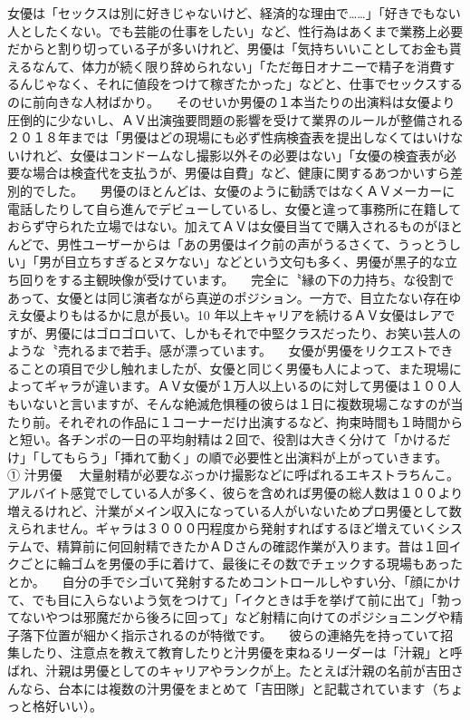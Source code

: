 \documentclass[12pt,UTF8]{ctexbook}
\begin{document}
女優は「セックスは別に好きじゃないけど、経済的な理由で……」「好きでもない人としたくない。でも芸能の仕事をしたい」など、性行為はあくまで業務上必要だからと割り切っている子が多いけれど、男優は「気持ちいいことしてお金も貰えるなんて、体力が続く限り辞められない」「ただ毎日オナニーで精子を消費するんじゃなく、それに値段をつけて稼ぎたかった」などと、仕事でセックスするのに前向きな人材ばかり。
　そのせいか男優の１本当たりの出演料は女優より圧倒的に少ないし、ＡＶ出演強要問題の影響を受けて業界のルールが整備される２０１８年までは「男優はどの現場にも必ず性病検査表を提出しなくてはいけないけれど、女優はコンドームなし撮影以外その必要はない」「女優の検査表が必要な場合は検査代を支払うが、男優は自費」など、健康に関するあつかいすら差別的でした。
　男優のほとんどは、女優のように勧誘ではなくＡＶメーカーに電話したりして自ら進んでデビューしているし、女優と違って事務所に在籍しておらず守られた立場ではない。加えてＡＶは女優目当てで購入されるものがほとんどで、男性ユーザーからは「あの男優はイク前の声がうるさくて、うっとうしい」「男が目立ちすぎるとヌケない」などという文句も多く、男優が黒子的な立ち回りをする主観映像が受けています。
　完全に〝縁の下の力持ち〟な役割であって、女優とは同じ演者ながら真逆のポジション。一方で、目立たない存在ゆえ女優よりもはるかに息が長い。10
 年以上キャリアを続けるＡＶ女優はレアですが、男優にはゴロゴロいて、しかもそれで中堅クラスだったり、お笑い芸人のような〝売れるまで若手〟感が漂っています。
　女優が男優をリクエストできることの項目で少し触れましたが、女優と同じく男優も人によって、また現場によってギャラが違います。ＡＶ女優が１万人以上いるのに対して男優は１００人もいないと言いますが、そんな絶滅危惧種の彼らは１日に複数現場こなすのが当たり前。それぞれの作品に１コーナーだけ出演するなど、拘束時間も１時間からと短い。各チンポの一日の平均射精は２回で、役割は大きく分けて「かけるだけ」「してもらう」「挿れて動く」の順で必要性と出演料が上がっていきます。
①
 汁男優
　大量射精が必要なぶっかけ撮影などに呼ばれるエキストラちんこ。アルバイト感覚でしている人が多く、彼らを含めれば男優の総人数は１００より増えるけれど、汁業がメイン収入になっている人がいないためプロ男優として数えられません。ギャラは３０００円程度から発射すればするほど増えていくシステムで、精算前に何回射精できたかＡＤさんの確認作業が入ります。昔は１回イクごとに輪ゴムを男優の手に着けて、最後にその数でチェックする現場もあったとか。
　自分の手でシゴいて発射するためコントロールしやすい分、「顔にかけて、でも目に入らないよう気をつけて」「イクときは手を挙げて前に出て」「勃ってないやつは邪魔だから後ろに回って」など射精に向けてのポジショニングや精子落下位置が細かく指示されるのが特徴です。
　彼らの連絡先を持っていて招集したり、注意点を教えて教育したりと汁男優を束ねるリーダーは「汁親」と呼ばれ、汁親は男優としてのキャリアやランクが上。たとえば汁親の名前が吉田さんなら、台本には複数の汁男優をまとめて「吉田隊」と記載されています（ちょっと格好いい）。
\end{document}
